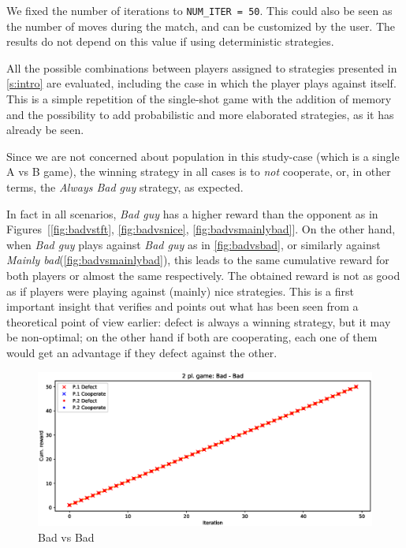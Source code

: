 \documentclass[journal,a4paper,10pt,twoside]{IEEEtran} %
\begin{document}
We fixed the number of iterations to \texttt{NUM\_ITER = 50}. This could also be seen as the number of moves during the match, and can be customized by the user. The results do not depend on this value if using deterministic strategies.

All the possible combinations between players assigned to strategies presented in \ref{s:intro} are evaluated, including the case in which the player plays against itself.
This is a simple repetition of the single-shot game with the addition of memory and the possibility to add probabilistic and more elaborated strategies, as it has already be seen.

Since we are not concerned about population in this study-case (which is a single A vs B game), the winning strategy in all cases is to \textit{not} cooperate, or, in other terms, the \textit{Always Bad guy} strategy, as expected.

In fact in all scenarios, \textit{Bad guy} has a higher reward than the opponent as in Figures~[\ref{fig:badvstft}, \ref{fig:badvsnice}, \ref{fig:badvsmainlybad}]. 
On the other hand, when \textit{Bad guy} plays against \textit{Bad guy} as in \autoref{fig:badvsbad}, or similarly against \textit{Mainly bad}(\autoref{fig:badvsmainlybad}), this leads to the same cumulative reward for both players or almost the same respectively. The obtained reward is not as good as if players were playing against (mainly) nice strategies. This is a first important insight that verifies and points out what has been seen from a theoretical point of view earlier: defect is always a winning strategy, but it may be non-optimal; on the other hand if both are cooperating, each one of them would get an advantage if they defect against the other.

\begin{figure}[!ht]
    \centering
    \includegraphics[width=1\columnwidth]{../img/ipd2p/ipd2p-rewards-Bad-Bad}
    \caption{Bad vs Bad}
    \label{fig:badvsbad}
\end{figure}
\end{document}
